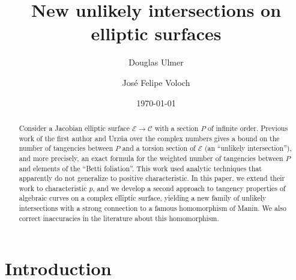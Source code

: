 \documentclass[12pt,reqno]{amsart}
\numberwithin{equation}{section}
\theoremstyle{plain}
\theoremstyle{definition}
\theoremstyle{remark}
\newcommand{\CC}{\mathcal{C}}
\newcommand{\EE}{\mathcal{E}}
\newcommand{\<}{\langle}
\renewcommand{\>}{\rangle}
\numberwithin{equation}{section}
\begin{document}
\title{New unlikely intersections on elliptic surfaces}

\author{Douglas Ulmer}
\address{Department of Mathematics \\ University of Arizona
 \\ Tucson, AZ~~85721 USA}

\author{Jos\'e Felipe Voloch}
\address{School of Mathematics and Statistics, University of
  Canterbury, Private Bag 4800, Christchurch 8140, New Zealand} 

\date{\today}







\begin{abstract}
  Consider a Jacobian elliptic surface $\EE\to\CC$ with a section $P$
  of infinite order.  Previous work of the first author and Urz\'ua
  over the complex numbers gives a bound on the number of tangencies
  between $P$ and a torsion section of $\EE$ (an ``unlikely
  intersection''), and more precisely, an exact formula for the
  weighted number of tangencies between $P$ and elements of the
  ``Betti foliation''.  This work used analytic techniques that
  apparently do not generalize to positive characteristic.  In this paper,
  we extend their work to characteristic $p$, and we develop a
  second approach to tangency properties of algebraic curves on a
  complex elliptic surface, yielding a new family of unlikely
  intersections with a strong connection to a famous homomorphism of
  Manin.  We also correct inaccuracies in the literature about this
  homomorphism.
\end{abstract}


\maketitle

\section{Introduction}
\end{document}
